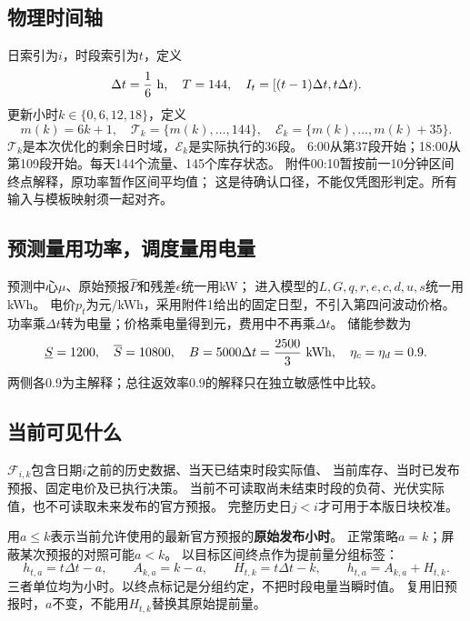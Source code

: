 \documentclass[UTF8,11pt]{ctexart}
\begin{document}
\subsection{物理时间轴}
日索引为$i$，时段索引为$t$，定义
\begin{equation}
 \Delta t=\frac16\ {\rm h},\quad T=144,\quad
 I_t=[(t-1)\Delta t,t\Delta t).
\end{equation}
更新小时$k\in\{0,6,12,18\}$，定义
\begin{equation}
 m(k)=6k+1,\quad
 \mathcal T_k=\{m(k),\ldots,144\},\quad
 \mathcal E_k=\{m(k),\ldots,m(k)+35\}.
\end{equation}
$\mathcal T_k$是本次优化的剩余日时域，$\mathcal E_k$是实际执行的36段。
6:00从第37段开始；18:00从第109段开始。每天144个流量、145个库存状态。
附件00:10暂按前一10分钟区间终点解释，原功率暂作区间平均值；
这是待确认口径，不能仅凭图形判定。所有输入与模板映射须一起对齐。

\subsection{预测量用功率，调度量用电量}
预测中心$\mu$、原始预报$\widehat P$和残差$\epsilon$统一用kW；
进入模型的$L,G,q,r,e,c,d,u,s$统一用kWh。
电价$p_t$为元/kWh，采用附件1给出的固定日型，不引入第四问波动价格。
功率乘$\Delta t$转为电量；价格乘电量得到元，费用中不再乘$\Delta t$。
储能参数为
\begin{equation}
 \underline S=1200,\quad\overline S=10800,\quad
 B=5000\Delta t=\frac{2500}{3}\ {\rm kWh},\quad
 \eta_c=\eta_d=0.9.
\end{equation}
两侧各0.9为主解释；总往返效率0.9的解释只在独立敏感性中比较。

\subsection{当前可见什么}
$\mathcal F_{i,k}$包含日期$i$之前的历史数据、当天已结束时段实际值、
当前库存、当时已发布预报、固定电价及已执行决策。
当前不可读取尚未结束时段的负荷、光伏实际值，也不可读取未来发布的官方预报。
完整历史日$j<i$才可用于本版日块校准。

用$a\leq k$表示当前允许使用的最新官方预报的\textbf{原始发布小时}。
正常策略$a=k$；屏蔽某次预报的对照可能$a<k$。
以目标区间终点作为提前量分组标签：
\begin{equation}
 h_{t,a}=t\Delta t-a,\qquad A_{k,a}=k-a,\qquad
 H_{t,k}=t\Delta t-k,\qquad h_{t,a}=A_{k,a}+H_{t,k}.
\end{equation}
三者单位均为小时。以终点标记是分组约定，不把时段电量当瞬时值。
复用旧预报时，$a$不变，不能用$H_{t,k}$替换其原始提前量。
\end{document}
